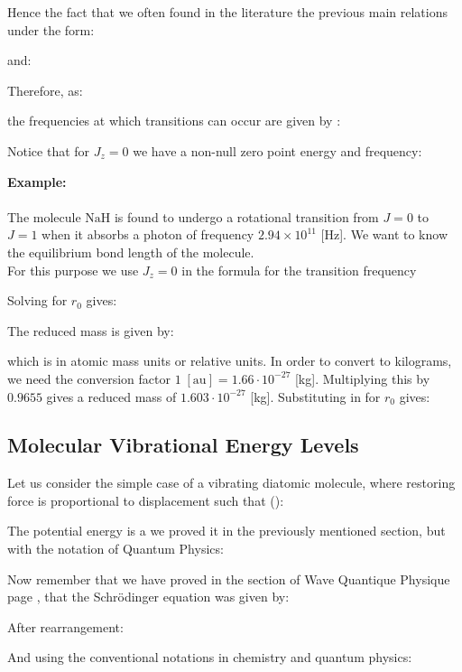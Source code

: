 	Hence the fact that we often found in the literature the previous main relations under the form:
	
	and:
	
	Therefore, as: 
	
	the frequencies at which transitions can occur are given by :
	
	Notice that for $J_z=0$ we have a non-null zero point energy and frequency:
	
	
	\begin{tcolorbox}[colframe=black,colback=white,sharp corners]
	\textbf{{\Large {}}Example:}\\\\
	The molecule $\mathrm{NaH}$ is found to undergo a rotational transition from  $J=0$ to $J=1$ when it absorbs a photon of frequency $2.94 \times 10^{11}$ [Hz]. We want to know the equilibrium bond length of the molecule.\\

	For this purpose we use $J_z=0$ in the formula for the transition frequency 
	
	Solving for $r_0$ gives:
	
	The reduced mass is given by:
	
	which is in atomic mass units or relative units. In order to convert to kilograms, we need the conversion factor $1\;[\text{au}]= 1.66\cdot 10^{-27}$ [kg]. Multiplying this by $0.9655$ gives a reduced mass of $1.603\cdot 10^{-27}$ [kg]. Substituting in for $r_0$ gives:
	
	\end{tcolorbox}

	\pagebreak
	\subsection{Molecular Vibrational Energy Levels}\label{molecular vibrations}
	Let us consider the simple case of a vibrating diatomic molecule, where restoring force is proportional to displacement such that ():
	
	The potential energy is a we proved it in the previously mentioned section, but with the notation of Quantum Physics:
	
	Now remember that we have proved in the section of Wave Quantique Physique page \pageref{schrodinger wave equation}, that the Schrödinger equation was given by:
	
	After rearrangement:
	
	And using the conventional notations in chemistry and quantum physics:
	
